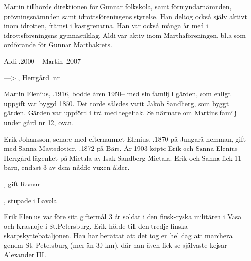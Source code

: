 Martin tillhörde direktionen för Gunnar folkskola, samt förmyndarnämnden, prövningsnämnden samt idrottsföreningens styrelse. Han deltog också själv aktivt inom idrotten, främst i kastgrenarna. Han var också många år med i idrottsföreningens gymnastiklag. Aldi var aktiv inom Marthaföreningen, bl.a som ordförande för Gunnar Marthakrets.

Aldi .2000  --  Martin .2007


---> , Herrgård,	nr 


Martin Elenius, .1916,  bodde åren 1950-- med sin familj i gården, som enligt uppgift var byggd 1850. Det torde således varit Jakob Sandberg, som byggt gården. Gården var uppförd i trä med tegeltak. Se närmare om Martins familj under gård nr 12, ovan.

Erik Johansson, senare med efternamnet Elenius,  .1870 på Jungarå hemman, gift med Sanna Mattsdotter,  .1872 på Bärs. År 1903 köpte Erik och Sanna Elenius Herrgård lägenhet på Mietala av Isak Sandberg Mietala. Erik och Sanna fick 11 barn, endast 3 av dem nådde vuxen ålder.
\begin{jhchildren}
  \item {}
  \item {}
  \item {}
  \item {}
  \item {}, gift Romar
  \item {}
  \item {}
  \item {}
  \item {}
  \item {}
  \item {}, stupade i Lavola
\end{jhchildren}
Erik Elenius var före sitt giftermål 3 år soldat i den finsk-ryska militären i Vasa och Krasnoje i St.Petersburg. Erik hörde till den tredje finska skarpskyttebataljonen. Han har berättat att det tog en hel dag att marchera genom St. Petersburg (mer än 30 km), där han även fick se självaste kejsar Alexander III.

